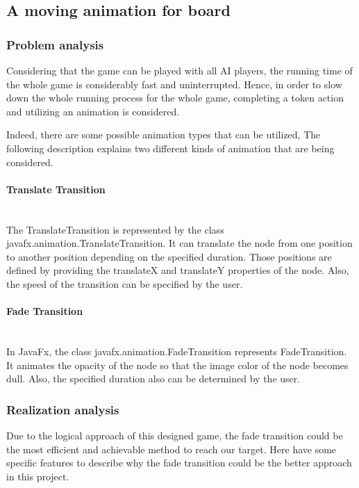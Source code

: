 \subsection{A moving animation for board}

\subsubsection{Problem analysis}

Considering that the game can be played with all AI players, the running time of the whole game is considerably fast and uninterrupted. Hence, in order to slow down the whole running process for the whole game, completing a token action and utilizing an animation is considered. 

Indeed, there are some possible animation types that can be utilized, The following description explains two different kinds of animation that are being considered.  

\paragraph{Translate Transition} \mbox{}\\

The TranslateTransition is represented by the class javafx.animation.TranslateTransition. It can translate the node from one position to another position depending on the specified duration. Those positions are defined by providing the translateX and translateY properties of the node. Also, the speed of the transition can be specified by the user. 

\paragraph{Fade Transition} \mbox{}\\
In JavaFx, the class javafx.animation.FadeTransition represents FadeTransition. It animates the opacity of the node so that the image color of the node becomes dull. Also, the specified duration also can be determined by the user. 

\subsubsection{Realization analysis}
Due to the logical approach of this designed game, the fade transition could be the most efficient and achievable method to reach our target. Here have some specific features to describe why the fade transition could be the better approach in this project. 


